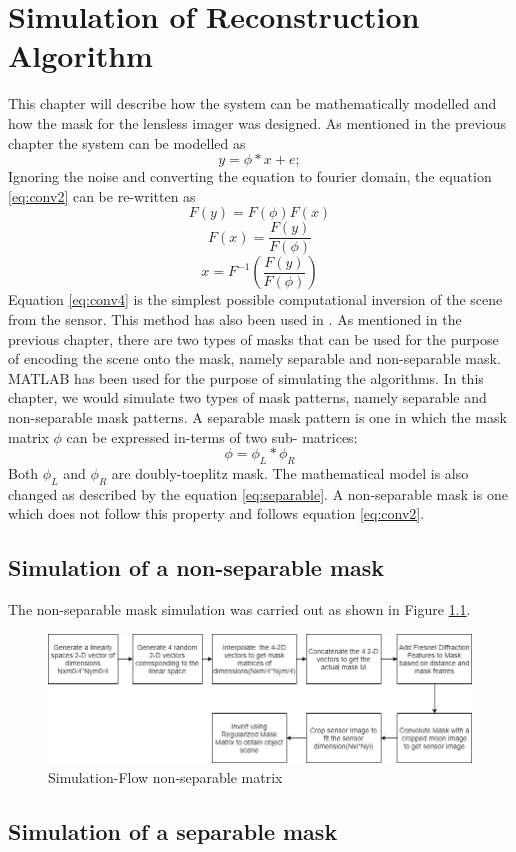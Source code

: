 \chapter{Simulation of Reconstruction Algorithm}
This chapter will describe how the system can be mathematically modelled and how the mask for the lensless imager was designed. As mentioned in the previous chapter the system can be modelled as 
\begin{equation}
\label{eq:conv2}
y = \phi * x + e ;
\end{equation}
Ignoring the noise and converting the equation to fourier domain, the equation \ref{eq:conv2} can be re-written as
\begin{equation}
\label{eq:conv3}
F(y) = F(\phi)F(x)
\end{equation}
\begin{equation}
\label{eq:conv3}
F(x) = \frac{F(y)}{F(\phi)}
\end{equation}
\begin{equation}
\label{eq:conv4}
x = F^{-1}(\frac{F(y)}{F(\phi)})
\end{equation}
Equation \ref{eq:conv4} is the simplest possible computational inversion of the scene from the sensor. This method has also been used in \cite{Toeplitz}. As mentioned in the previous chapter, there are two types of masks that can be used for the purpose of encoding the scene onto the mask, namely separable and non-separable mask. MATLAB has been used for the purpose of simulating the algorithms. In this chapter, we would simulate two types of mask patterns, namely separable and non-separable mask patterns. A separable mask pattern is one in which the mask matrix $\phi$ can be expressed in-terms of two sub- matrices:
\begin{equation}
\phi = \phi_L * \phi_R
\end{equation}
Both $\phi_L$ and $\phi_R$ are doubly-toeplitz mask. The mathematical model is also changed as described by the equation \ref{eq:separable}. A non-separable mask is one which does not follow this property and follows equation \ref{eq:conv2}.

\section{Simulation of a non-separable mask}
The non-separable mask simulation was carried out as shown in Figure \ref{fig:non_sep_sim}.

\begin{figure}[ht]
\includegraphics[scale = 0.50]{pics/non_sep_sim_flow}
\caption{Simulation-Flow non-separable matrix}
\label{fig:non_sep_sim}
\end{figure}
\section{Simulation of a separable mask}